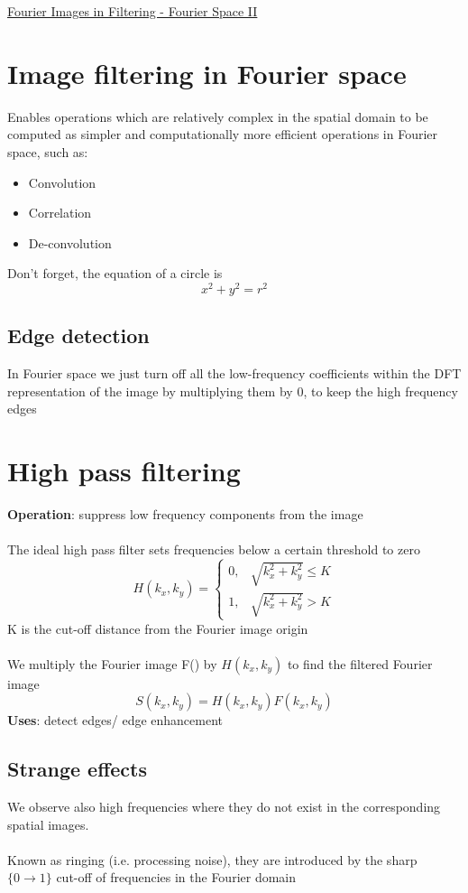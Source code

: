 \documentclass{article}[18pt]
\begin{document}
\begin{center}
\underline{\huge Fourier Images in Filtering - Fourier Space II}
\end{center}
\section{Image filtering in Fourier space}
Enables operations which are relatively complex in the spatial domain to be computed as simpler and computationally more efficient operations in Fourier space, such as:
\begin{itemize}
	\item Convolution
	\item Correlation
	\item De-convolution
\end{itemize}
\begin{important}
Don't forget, the equation of a circle is
$$x^2+y^2=r^2$$
\end{important}
\subsection{Edge detection}
In Fourier space we just turn off all the low-frequency coefficients within the DFT representation of the image by multiplying them by 0, to keep the high frequency edges
\section{High pass filtering}
\textbf{Operation}: suppress low frequency components from the image\\
\\
The ideal high pass filter sets frequencies below a certain threshold to zero
\[
H\left(k_{x}, k_{y}\right)=\left\{\begin{array}{ll}{0,} & {\sqrt{k_{x}^{2}+k_{y}^{2}} \leq K} \\ {1,} & {\sqrt{k_{x}^{2}+k_{y}^{2}}>K}\end{array}\right.
\]
K is the cut-off distance from the Fourier image origin\\
\\
We multiply the Fourier image F() by $H(k_x,k_y)$ to find the filtered Fourier image
$$S(k_x,k_y)=H(k_x,k_y)F(k_x,k_y)$$
\textbf{Uses}: detect edges/ edge enhancement
\subsection{Strange effects}
We observe also high frequencies where they do not exist in the corresponding spatial images.\\
\\
Known as ringing (i.e. processing noise), they are introduced by the sharp $\{0\rightarrow 1\}$ cut-off of frequencies in the Fourier domain
\end{document}

